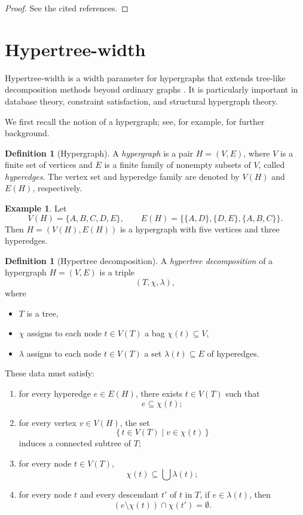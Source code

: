 \documentclass[10pt]{book}
\theoremstyle{definition}
\newtheorem{definition}[theorem]{Definition}
\newtheorem{example}[theorem]{Example}
\begin{document}
\begin{proof}
See the cited references.
\end{proof}

\section{Hypertree-width}
Hypertree-width is a width parameter for hypergraphs that extends tree-like decomposition methods beyond ordinary graphs \cite{40}.  
It is particularly important in database theory, constraint satisfaction, and structural hypergraph theory.

We first recall the notion of a hypergraph; see, for example, \cite{bretto2013hypergraph,feng2019hypergraph} for further background.

\begin{definition}[Hypergraph]
\cite{bretto2013hypergraph}
A \emph{hypergraph} is a pair \(H=(V,E)\), where \(V\) is a finite set of vertices and \(E\) is a finite family of nonempty subsets of \(V\), called \emph{hyperedges}.  
The vertex set and hyperedge family are denoted by \(V(H)\) and \(E(H)\), respectively.
\end{definition}

\begin{example}
Let
\[
V(H)=\{A,B,C,D,E\},
\qquad
E(H)=\bigl\{\{A,D\},\{D,E\},\{A,B,C\}\bigr\}.
\]
Then \(H=(V(H),E(H))\) is a hypergraph with five vertices and three hyperedges.
\end{example}

\begin{definition}[Hypertree decomposition]
\cite{40}
A \emph{hypertree decomposition} of a hypergraph \(H=(V,E)\) is a triple
\[
(T,\chi,\lambda),
\]
where
\begin{itemize}
    \item \(T\) is a tree,
    \item \(\chi\) assigns to each node \(t\in V(T)\) a bag \(\chi(t)\subseteq V\),
    \item \(\lambda\) assigns to each node \(t\in V(T)\) a set \(\lambda(t)\subseteq E\) of hyperedges.
\end{itemize}
These data must satisfy:
\begin{enumerate}
    \item for every hyperedge \(e\in E(H)\), there exists \(t\in V(T)\) such that
    \[
    e\subseteq \chi(t);
    \]
    \item for every vertex \(v\in V(H)\), the set
    \[
    \{\,t\in V(T)\mid v\in \chi(t)\,\}
    \]
    induces a connected subtree of \(T\);
    \item for every node \(t\in V(T)\),
    \[
    \chi(t)\subseteq \bigcup \lambda(t);
    \]
    \item for every node \(t\) and every descendant \(t'\) of \(t\) in \(T\), if \(e\in \lambda(t)\), then
    \[
    (e\setminus \chi(t))\cap \chi(t')=\emptyset.
    \]
\end{enumerate}
\end{definition}
\end{document}
